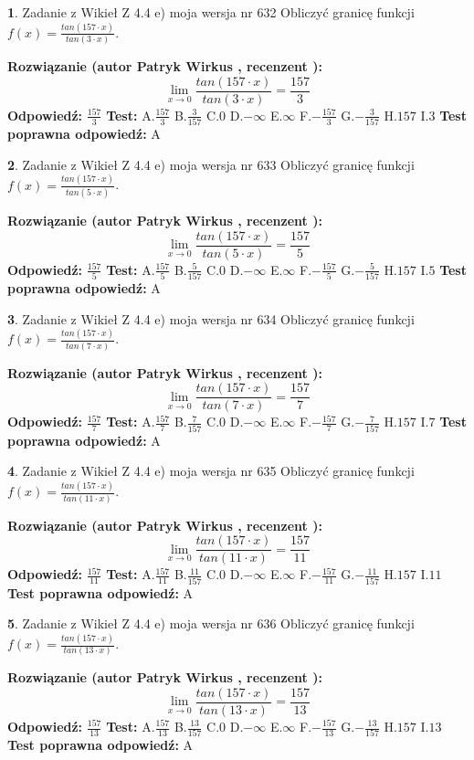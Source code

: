 \documentclass[12pt, a4paper]{article}
\theoremstyle{definition} %
\newtheorem{zad}{}
\newcommand{\zadStart}[1]{\begin{zad}#1\newline}
\newcommand{\zadStop}{\end{zad}}
\newcommand{\rozwStart}[2]{\noindent \textbf{Rozwiązanie (autor #1 , recenzent #2): }\newline}
\newcommand{\rozwStop}{\newline}
\newcommand{\odpStart}{\noindent \textbf{Odpowiedź:}\newline}
\newcommand{\odpStop}{\newline}
\newcommand{\testStart}{\noindent \textbf{Test:}\newline}
\newcommand{\testStop}{\newline}
\newcommand{\kluczStart}{\noindent \textbf{Test poprawna odpowiedź:}\newline}
\newcommand{\kluczStop}{\newline}
\begin{document}
\zadStart{Zadanie z Wikieł Z 4.4 e) moja wersja nr 632}
Obliczyć granicę funkcji $f(x)=\frac{tan(157\cdot x)}{tan(3\cdot x)}$.
\zadStop
\rozwStart{Patryk Wirkus}{}
$$\lim\limits_{x\to 0}\frac{tan(157\cdot x)}{tan(3\cdot x)}=
\frac{157}{3}$$
\rozwStop
\odpStart
$\frac{157}{3}$
\odpStop
\testStart
A.$\frac{157}{3}$
B.$\frac{3}{157}$
C.$0$
D.$-\infty$
E.$\infty$
F.$-\frac{157}{3}$
G.$-\frac{3}{157}$
H.$157$
I.$3$
\testStop
\kluczStart
A
\kluczStop



\zadStart{Zadanie z Wikieł Z 4.4 e) moja wersja nr 633}
Obliczyć granicę funkcji $f(x)=\frac{tan(157\cdot x)}{tan(5\cdot x)}$.
\zadStop
\rozwStart{Patryk Wirkus}{}
$$\lim\limits_{x\to 0}\frac{tan(157\cdot x)}{tan(5\cdot x)}=
\frac{157}{5}$$
\rozwStop
\odpStart
$\frac{157}{5}$
\odpStop
\testStart
A.$\frac{157}{5}$
B.$\frac{5}{157}$
C.$0$
D.$-\infty$
E.$\infty$
F.$-\frac{157}{5}$
G.$-\frac{5}{157}$
H.$157$
I.$5$
\testStop
\kluczStart
A
\kluczStop



\zadStart{Zadanie z Wikieł Z 4.4 e) moja wersja nr 634}
Obliczyć granicę funkcji $f(x)=\frac{tan(157\cdot x)}{tan(7\cdot x)}$.
\zadStop
\rozwStart{Patryk Wirkus}{}
$$\lim\limits_{x\to 0}\frac{tan(157\cdot x)}{tan(7\cdot x)}=
\frac{157}{7}$$
\rozwStop
\odpStart
$\frac{157}{7}$
\odpStop
\testStart
A.$\frac{157}{7}$
B.$\frac{7}{157}$
C.$0$
D.$-\infty$
E.$\infty$
F.$-\frac{157}{7}$
G.$-\frac{7}{157}$
H.$157$
I.$7$
\testStop
\kluczStart
A
\kluczStop



\zadStart{Zadanie z Wikieł Z 4.4 e) moja wersja nr 635}
Obliczyć granicę funkcji $f(x)=\frac{tan(157\cdot x)}{tan(11\cdot x)}$.
\zadStop
\rozwStart{Patryk Wirkus}{}
$$\lim\limits_{x\to 0}\frac{tan(157\cdot x)}{tan(11\cdot x)}=
\frac{157}{11}$$
\rozwStop
\odpStart
$\frac{157}{11}$
\odpStop
\testStart
A.$\frac{157}{11}$
B.$\frac{11}{157}$
C.$0$
D.$-\infty$
E.$\infty$
F.$-\frac{157}{11}$
G.$-\frac{11}{157}$
H.$157$
I.$11$
\testStop
\kluczStart
A
\kluczStop



\zadStart{Zadanie z Wikieł Z 4.4 e) moja wersja nr 636}
Obliczyć granicę funkcji $f(x)=\frac{tan(157\cdot x)}{tan(13\cdot x)}$.
\zadStop
\rozwStart{Patryk Wirkus}{}
$$\lim\limits_{x\to 0}\frac{tan(157\cdot x)}{tan(13\cdot x)}=
\frac{157}{13}$$
\rozwStop
\odpStart
$\frac{157}{13}$
\odpStop
\testStart
A.$\frac{157}{13}$
B.$\frac{13}{157}$
C.$0$
D.$-\infty$
E.$\infty$
F.$-\frac{157}{13}$
G.$-\frac{13}{157}$
H.$157$
I.$13$
\testStop
\kluczStart
A
\kluczStop
\end{document}
